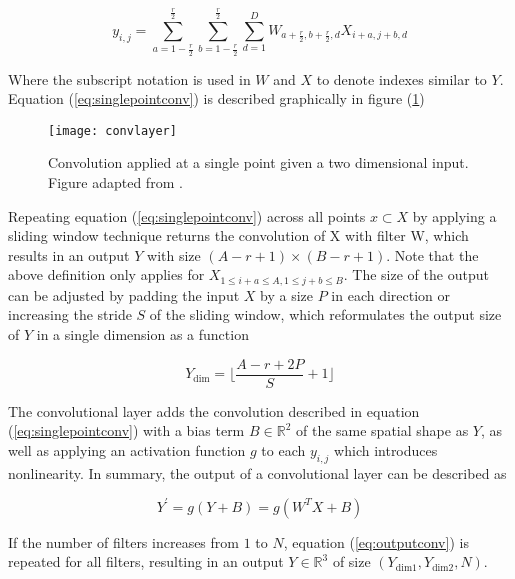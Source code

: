 \documentclass[../main/thesis.tex]{subfiles}
\begin{document}
\begin{equation}
    \label{eq:singlepointconv}
    y_{i,j} = \sum_{a=1-\frac{r}{2}}^\frac{r}{2} \sum_{b=1-\frac{r}{2}}^\frac{r}{2} \sum_{d=1}^D W_{a + \frac{r}{2},b + \frac{r}{2}, d} X_{i+a,j+b,d}
\end{equation}

Where the subscript notation is used in $W$ and $X$ to denote indexes similar to $Y$. Equation (\ref{eq:singlepointconv}) is described graphically in figure (\ref{fig:convlayer})

\begin{figure}
    \centering
    \texttt{[image: convlayer]}
    \caption{\label{fig:convlayer}Convolution applied at a single point given a two dimensional input. Figure adapted from \protect\citep{Yamashita2018}.}
\end{figure}

Repeating equation (\ref{eq:singlepointconv}) across all points $x \subset X$ by applying a sliding window technique returns the convolution of X with filter W, which results in an output $Y$ with size $(A-r+1) \times (B-r+1)$. Note that the above definition only applies for $X_{1 \leq i+a \leq A, 1 \leq j+b \leq B}$. The size of the output can be adjusted by padding the input $X$ by a size $P$ in each direction or increasing the stride $S$ of the sliding window, which reformulates the output size of $Y$ in a single dimension as a function

\begin{equation}
    \label{eq:outputdim}
    Y_\text{dim} = \lfloor\frac{A - r + 2P}{S} + 1\rfloor    
\end{equation}

The convolutional layer adds the convolution described in equation (\ref{eq:singlepointconv}) with a bias term $B \in{\mathbb{R}^2}$ of the same spatial shape as $Y$, as well as applying an activation function $g$ to each $y_{i,j}$ which introduces nonlinearity. In summary, the output of a convolutional layer can be described as 

\begin{equation}
    \label{eq:outputconv}
    Y^\prime = g(Y + B) = g(W^TX + B)
\end{equation}

If the number of filters increases from $1$ to $N$, equation (\ref{eq:outputconv}) is repeated for all filters, resulting in an output $Y \in{\mathbb{R}^3}$ of size $(Y_\text{dim1}, Y_\text{dim2}, N)$.
\end{document}
